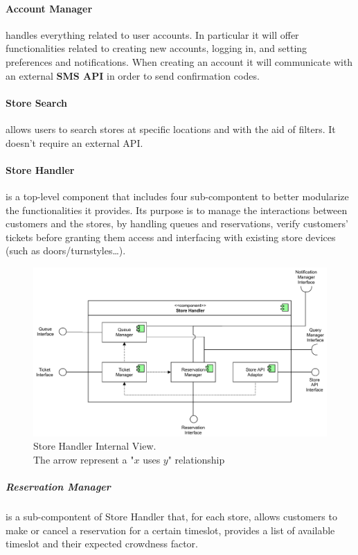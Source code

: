 \paragraph{Account Manager} handles everything related to user accounts. In particular it will offer functionalities related to creating new accounts, logging in, and setting preferences and notifications. When creating an account it will communicate with an external \textbf{SMS API} in order to send confirmation codes.

\paragraph{Store Search} allows users to search stores at specific locations and with the aid of filters. It doesn't require an external API.

\paragraph{Store Handler} is a top-level component that includes four sub-compontent to better modularize the functionalities it provides.
Its purpose is to manage the interactions between customers and the stores, by handling queues and reservations, verify customers' tickets before granting them access and interfacing with existing store devices (such as doors/turnstyles\dots).

\begin{figure}[H]
    \centering
    \includegraphics[width=0.8\linewidth]{images/draw.io/store_handler.pdf}
    \caption{Store Handler Internal View.\\The arrow represent a "$x$ uses $y$" relationship}
    \label{fig:store_handler}
\end{figure}

\subparagraph{Reservation Manager} is a sub-compontent of Store Handler that, for each store, allows customers to make or cancel a reservation for a certain timeslot, provides a list of available timeslot and their expected crowdness factor.

